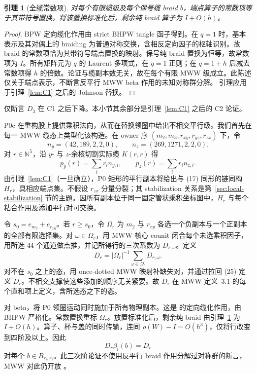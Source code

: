 \documentclass[11pt]{amsart}
\newtheorem{lemma}[theorem]{引理}
\theoremstyle{definition}
\theoremstyle{remark}
\begin{document}
\begin{lemma}[全缆常数项]\label{lem:C2}
对每个有限缆级及每个保号缆 braid \(b\)，端点算子的常数项等于其带符号置换。将该置换标准化后，剩余纯 braid 算子为 \(I+O(h)\)。
\end{lemma}

\begin{proof}
BPW 定向缆化作用由 strict BHPW tangle 函子得到。在 \(q=1\) 时，基本表示及其对偶上的 braiding 为普通对称交换，含相反定向因子的枢轴识别。故 braid 的常数项恰为其带符号端点置换的映射。保号纯 braid 置换为恒等，故常数项为 \(I\)。所有矩阵元为 \(q\) 的 Laurent 多项式，在 \(q=1\) 正则；在 \(q=1+h\) 后减去常数项得 \(h\) 的倍数。论证与缆副本数无关，故在每个有限 MWW 级成立。此陈述仅关于端点表示，不断言反平行 MWW beta 作用的未知对称群分解。
引理应用于引理~\ref{lem:C1} 之后的 Johnson 替换。
\end{proof}

仅断言 $D_3$ 在 C1 之后下降。本小节其余部分是引理~\ref{lem:C1} 之后的 C2 论证。

P0c 在重构股上提供乘积法向，从而在替换领圈中给出不相交平行级。我们首先在每一 MWW 缆态上类型化该构造。在 owner 序 $(m_2,m_3,r_{xy},r_{yz},r_{zx})$ 下，令
\[
n_y=(42,189,2,2,0),\qquad n_z=(269,1271,2,2,0).
\]
对 $r\in\mathbb N^5$，沿 $y$- 与 $z$-余核切割实际缆 $K(r,r)$ 得
\[
p_y(r)=\sum_i r_i n_{y,i},\qquad
p_z(r)=\sum_i r_i n_{z,i}.
\tag{24}
\]
由引理~\ref{lem:C1}（一旦确立），P0 矩形的平行副本将给出与 (17) 同形的链同构 $H_r$，具相应端点集。不假设 $r_{zx}$ 分量分裂；其 stabilization 关系是第~\ref{sec:local-stabilization} 节的主题。因所有副本位于同一固定管状乘积坐标图中，$H_r$ 与每个粘合作用及添加平行对可交换。

令 $s_0=e_{m_2}+e_{r_{xy}}$。若 $r\ge s_0$，令 $\Omega_r$ 为 $m_2$ 与 $r_{xy}$ 各选一个负副本与一个正副本的全部有限选择集。对 $\omega\in\Omega_r$，用 MWW 核心 counit 闭合每个未选乘积因子，用所选 44 个通道做点推，并记所得行的三次系数为 $D_{r,\omega}$。定义
\[
D_r=|\Omega_r|^{-1}\sum_{\omega\in\Omega_r}D_{r,\omega}.
\tag{25}
\]
对不在 $s_0$ 之上的态，用 once-dotted MWW 映射补缺失对，并通过拉回 (25) 定义 $D_r$。不相交支撑使这些添加的顺序无关紧要。故 $D_r$ 在 MWW 定义~3.1 的每个直和项上定义，含所选态之下的态。

对 beta，将 P0 领圈运动同时施加于所有物理副本。这是 \cite[Theorem~E]{BeliakovaPutyraWehrli2019} 的定向缆化作用，由 BHPW 严格化。常数置换重标 $\Omega_r$。放置标准化后，剩余纯 braid 由引理~\ref{lem:C2} 为 \(I+O(h)\)。算子、杯与盖的同时传输，连同 $\rho(W)-I=O(h^3)$，仅将行改变到四阶及以上。因此
\[
D_r\beta_i(b)=D_r
\tag{26}
\]
对每个 $b\in B_{r_i,r_i}$。此三次阶论证不使用反平行 braid 作用分解过对称群的断言，MWW 对此仍开放
\cite[Remark~3.3]{ManolescuWalkerWedrich2023}。
\end{document}
